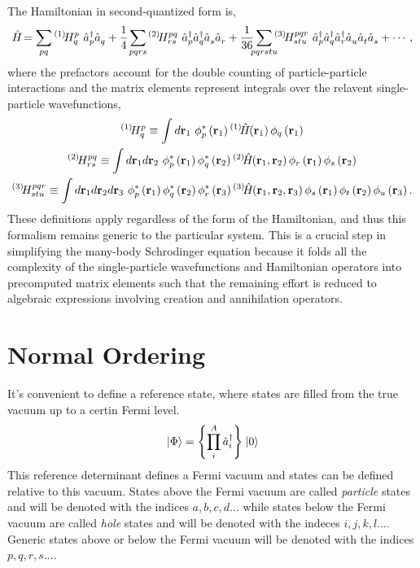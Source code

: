 \documentclass[thesis.tex]{subfiles}
\begin{document}
The Hamiltonian in second-quantized form is,
\begin{equation}
  \Ham = \sum_{\mathclap{pq}}\Hint{1}{p}{q}\ \co{p}\ao{q} + \frac{1}{4}\sum_{\mathclap{pqrs}}\Hint{2}{pq}{rs}\ \co{p}\co{q}\ao{s}\ao{r} + \frac{1}{36}\sum_{\mathclap{pqrstu}}\Hint{3}{pqr}{stu}\ \co{p}\co{q}\co{r}\ao{u}\ao{t}\ao{s} + \cdots,
\end{equation}
where the prefactors account for the double counting of particle-particle interactions and the matrix elements represent integrals over the relavent single-particle wavefunctions,
\begin{gather}
    {}^{\left(1\right)}\hspace{-2pt}H^{p}_{q} \equiv \int d\mathbf{r}_{1}\  \phi^{*}_{p}\left(\mathbf{r}_{1}\right) {}^{\left(1\right)}\hspace{-2pt}\hat{H}\hspace{-2.5pt}\left(\mathbf{r}_{1}\right) \phi_{q}\left(\mathbf{r}_{1}\right) \notag \\
    {}^{\left(2\right)}\hspace{-2pt}H^{pq}_{rs} \equiv \int d\mathbf{r}_{1} d\mathbf{r}_{2}\  \phi^{*}_{p}\left(\mathbf{r}_{1}\right)\phi^{*}_{q}\left(\mathbf{r}_{2}\right) {}^{\left(2\right)}\hspace{-2pt}\hat{H}\hspace{-2.5pt}\left(\mathbf{r}_{1},\mathbf{r}_{2}\right) \phi_{r}\left(\mathbf{r}_{1}\right)\phi_{s}\left(\mathbf{r}_{2}\right) \notag \\
    {}^{\left(3\right)}\hspace{-2pt}H^{pqr}_{stu} \equiv \int d\mathbf{r}_{1} d\mathbf{r}_{2} d\mathbf{r}_{3}\  \phi^{*}_{p}\left(\mathbf{r}_{1}\right)\phi^{*}_{q}\left(\mathbf{r}_{2}\right)\phi^{*}_{r}\left(\mathbf{r}_{3}\right) {}^{\left(3\right)}\hspace{-2pt}\hat{H}\hspace{-2.5pt}\left(\mathbf{r}_{1},\mathbf{r}_{2},\mathbf{r}_{3}\right) \phi_{s}\left(\mathbf{r}_{1}\right)\phi_{t}\left(\mathbf{r}_{2}\right)\phi_{u}\left(\mathbf{r}_{3}\right).
\end{gather}
These definitions apply regardless of the form of the Hamiltonian, and thus this formalism remains generic to the particular system.  This is a crucial step in simplifying the many-body Schrodinger equation because it folds all the complexity of the single-particle wavefunctions and Hamiltonian operators into precomputed matrix elements such that the remaining effort is reduced to algebraic expressions involving creation and annihilation operators.


\section{Normal Ordering}
It's convenient to define a reference state, where states are filled from the true vacuum up to a certin Fermi level.
\begin{equation}
  \hspace{1pt}\lvert \Phi \rangle = \left\{\prod_{i}^{A}\hat{a}_{i}^{\dagger}\right\}\hspace{1pt}\lvert 0 \rangle
\end{equation}
This reference determinant defines a Fermi vacuum and states can be defined relative to this vacuum. States above the Fermi vacuum are called \textit{particle} states and will be denoted with the indices $a,b,c,d...$ while states below the Fermi vacuum are called \textit{hole} states and will be denoted with the indeces $i,j,k,l...$. Generic states above or below the Fermi vacuum will be denoted with the indices $p,q,r,s...$.
\end{document}
